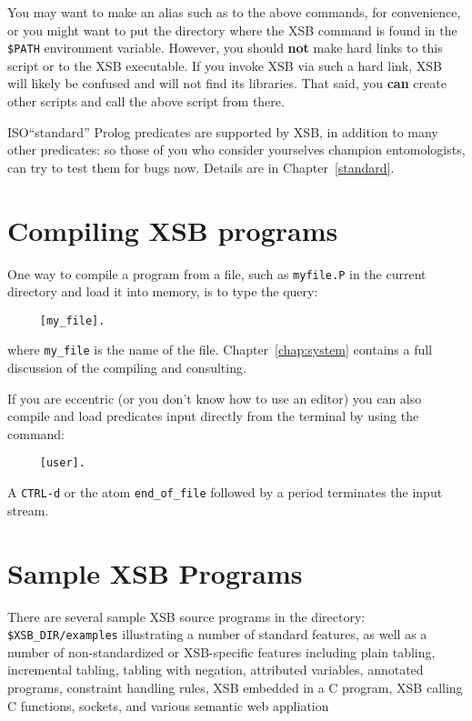 You may want to make an alias such as {\tt \smallourprolog} to the above
commands, for convenience, or you might want to put the directory where the
XSB command is found in the {\tt \$PATH} environment variable. However, you
should {\bf not} make hard links to this script or to the XSB executable.
If you invoke XSB via such a hard link, XSB will likely be confused and will
not find its libraries.  That said, you {\bf can} create other scripts and
call the above script from there.

ISO``standard'' Prolog predicates are supported by XSB, in addition to
many other predicates: so those of you who consider yourselves
champion entomologists, can try to test them for bugs now.  Details
are in Chapter~\ref{standard}.


\section{Compiling XSB programs}

One way to compile a program from a file, such as {\tt myfile.P} in
the current directory and load it into memory, is to type the query:
\begin{verbatim}
     [my_file].
\end{verbatim}
where \verb'my_file' is the name of the file.
Chapter~\ref{chap:system} contains a full discussion of the compiling
and consulting.

If you are eccentric (or you don't know how to use an editor) you can also 
compile and load predicates input directly from the terminal by using the
command:
\begin{verbatim}
     [user].
\end{verbatim}
A {\tt CTRL-d} or the atom \verb'end_of_file' followed by a period 
terminates the input stream.


\section{Sample XSB Programs}

There are several sample XSB source programs in the directory: {\tt
  \$XSB\_DIR/examples} illustrating a number of standard features, as
well as a number of non-standardized or XSB-specific features
including plain tabling, incremental tabling, tabling with negation,
attributed variables, annotated programs, constraint handling rules,
XSB embedded in a C program, XSB calling C functions, sockets, and
various semantic web appliation

